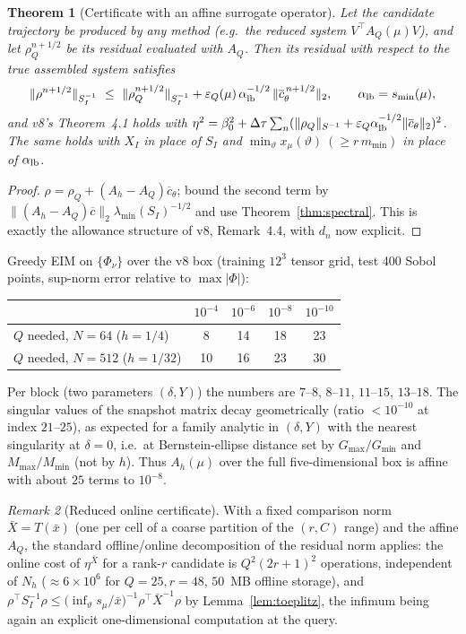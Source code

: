 \documentclass[11pt]{amsart}
\newtheorem{theorem}{Theorem}[section]
\theoremstyle{remark}
\newtheorem{remark}[theorem]{Remark}
\newcommand{\norm}[1]{\lVert #1\rVert}
\newcommand{\T}{T}
\begin{document}
\begin{theorem}[Certificate with an affine surrogate operator]\label{thm:eim-cert}
Let the candidate trajectory be produced by any method (e.g.\ the reduced
system $V^\top A_Q(\mu)V$), and let $\rho_Q^{n+1/2}$ be its residual
evaluated with $A_Q$.  Then its residual with respect to the true assembled
system satisfies
\[
 \norm{\rho^{n+1/2}}_{S_I^{-1}}\ \le\ \norm{\rho_Q^{n+1/2}}_{S_I^{-1}}
 +\varepsilon_Q(\mu)\,\alpha_{\rm lb}^{-1/2}\,\norm{\overline c_\theta^{\,n+1/2}}_2,
 \qquad \alpha_{\rm lb}=s_{\min}(\mu),
\]
and v8's Theorem~4.1 holds with $\eta^2=\beta_0^2+\Delta\tau\sum_n(\norm{\rho_Q}_{S^{-1}}+\varepsilon_Q\alpha_{\rm lb}^{-1/2}\norm{\overline c_\theta}_2)^2$.
The same holds with $X_I$ in place of $S_I$ and $\min_\vartheta x_\mu(\vartheta)\ (\ge r\,m_{\min})$ in place of $\alpha_{\rm lb}$.
\end{theorem}
\begin{proof}
$\rho=\rho_Q+(A_h-A_Q)\overline c_\theta$; bound the second term by
$\norm{(A_h-A_Q)\overline c}_2\lambda_{\min}(S_I)^{-1/2}$ and use
Theorem~\ref{thm:spectral}.  This is exactly the allowance structure of v8,
Remark~4.4, with $d_n$ now explicit.
\end{proof}

\noindent
Greedy EIM on $\{\Phi_\nu\}$ over the v8 box (training $12^3$ tensor grid,
test 400 Sobol points, sup-norm error relative to $\max|\Phi|$):
\begin{center}\small
\begin{tabular}{lcccc}
\toprule
 & $10^{-4}$ & $10^{-6}$ & $10^{-8}$ & $10^{-10}$\\
\midrule
$Q$ needed, $N=64$ ($h=1/4$) & 8 & 14 & 18 & 23\\
$Q$ needed, $N=512$ ($h=1/32$) & 10 & 16 & 23 & 30\\
\bottomrule
\end{tabular}
\end{center}
Per block (two parameters $(\delta,Y)$) the numbers are $7$--$8$, $8$--$11$,
$11$--$15$, $13$--$18$.  The singular values of the snapshot matrix decay
geometrically (ratio $<10^{-10}$ at index $21$--$25$), as expected for a family
analytic in $(\delta,Y)$ with the nearest singularity at $\delta=0$, i.e.\
at Bernstein-ellipse distance set by $G_{\max}/G_{\min}$ and $M_{\max}/M_{\min}$
(not by $h$).  Thus $A_h(\mu)$ over the full five-dimensional box is affine
with about $25$ terms to $10^{-8}$.

\begin{remark}[Reduced online certificate]
With a fixed comparison norm $\bar X=\T(\bar x)$ (one per cell of a coarse
partition of the $(r,C)$ range) and the affine $A_Q$, the standard
offline/online decomposition of the residual norm applies: the online cost of
$\eta^{\bar X}$ for a rank-$r$ candidate is $Q^2(2r+1)^2$ operations,
independent of $N_h$ ($\approx6\times10^6$ for $Q=25,r=48$, $50$~MB offline
storage), and
$\rho^\top S_I^{-1}\rho\le\bigl(\inf_\vartheta s_\mu/\bar x\bigr)^{-1}\rho^\top\bar X^{-1}\rho$
by Lemma~\ref{lem:toeplitz}, the infimum being again an explicit
one-dimensional computation at the query.
\end{remark}
\end{document}
